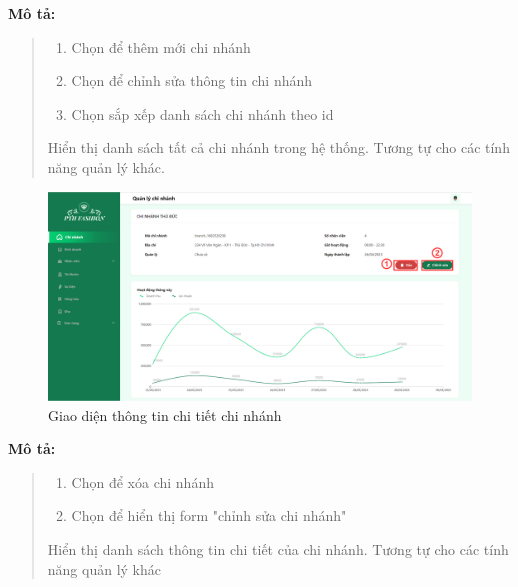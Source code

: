 \textbf{Mô tả:}
\begin{quote}
    \begin{enumerate}
        \item Chọn để thêm mới chi nhánh
        \item Chọn để chỉnh sửa thông tin chi nhánh
        \item Chọn sắp xếp danh sách chi nhánh theo id
    \end{enumerate}
    Hiển thị danh sách tất cả chi nhánh trong hệ thống. Tương tự cho các tính năng quản lý khác.
\end{quote}

\begin{figure}[!htp]
    \centering
    \includegraphics[width=12cm]{img/UI/admin_implement/branchDetail.png}
    \newline
    \caption{Giao diện thông tin chi tiết chi nhánh}
\end{figure}
\textbf{Mô tả:}
\begin{quote}
    \begin{enumerate}
        \item Chọn để xóa chi nhánh
        \item Chọn để hiển thị form "chỉnh sửa chi nhánh"
    \end{enumerate}
    Hiển thị danh sách thông tin chi tiết của chi nhánh. Tương tự cho các tính năng quản lý khác
\end{quote}


